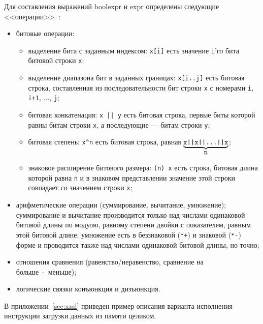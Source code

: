 Для составления выражений boolexpr и expr определены следующие <<операции>>~\cite{my_syrcose_2008, my_isp_2008}:
\begin{itemize}
    \item битовые операции:
        \begin{itemize}
            \item выделение бита с заданным индексом: \texttt{x[i]} есть значение \texttt{i}'го бита битовой строки \texttt{x};
            \item выделение диапазона бит в заданных границах: \texttt{x[i..j]} есть битовая строка, составленная из последовательности бит строки \texttt{x} с номерами \texttt{i}, \texttt{i+1}, ..., \texttt{j};
            \item битовая конкатенация: \texttt{x || y} есть битовая строка, первые биты которой равны битам строки \texttt{x}, а последующие --- битам строки \texttt{y};
            \item битовая степень: \texttt{x\^{ }n} есть битовая строка, равная $\underbrace{\mbox{\texttt{x||x||...||x}}}_{\mbox{\texttt{n}}}$;
            \item знаковое расширение битового размера: \texttt{(n) x} есть строка, битовая длина которой равна \texttt{n} и в знаковом представлении значение этой строки совпадает со значением строки \texttt{x};
        \end{itemize}
    \item арифметические операции (суммирование, вычитание, умножение); суммирование и вычитание производится только над числами одинаковой битовой длины по модулю, равному степени двойки с показателем, равным этой битовой длине; умножение есть в беззнаковой  (\texttt{*+}) и знаковой (\texttt{*-}) форме и проводится также над числами одинаковой битовой длины, но точно;
    \item отношения сравнения (равенство/неравенство, сравнение на\\больше~-~меньше);
    \item логические связки конъюнкция и дизъюнкция.
\end{itemize}

В приложении~\ref{sec:xml} приведен пример описания варианта исполнения инструкции загрузки данных из памяти целиком.

